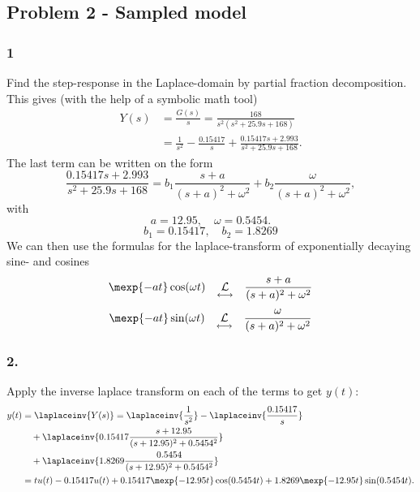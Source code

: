 \documentclass{scrartcl}
\begin{document}
\subsection*{Problem 2 - Sampled model}
\label{sec-8-2}
\subsubsection*{1}
\label{sec-8-2-1}

  Find the step-response in the Laplace-domain by partial fraction decomposition. This gives (with the help of a symbolic math tool)
       \begin{equation*}
        \begin{split}
         Y(s) &= \frac{G(s)}{s} = \frac{168}{s^2(s^2 + 25.9s + 168)}\\
              &= \frac{1}{s^2} - \frac{0.15417}{s} + \frac{0.15417s + 2.993}{s^2 + 25.9s + 168}.
        \end{split}
       \end{equation*}
      The last term can be written on the form 
      \[ \frac{0.15417s + 2.993}{s^2 + 25.9s + 168} = b_1\frac{s+a}{(s+a)^2 + \omega^2} + b_2\frac{\omega}{(s+a)^2 + \omega^2}, \] 
      with
      \[ a = 12.95, \quad \omega=0.5454. \]
      \[ b_1 = 0.15417, \quad b_2 = 1.8269\]
      We can then use the formulas for the laplace-transform of exponentially decaying sine- and cosines
      \[ \mexp{-at}\cos(\omega t) \quad \underset{\longleftrightarrow}{\mathcal{L}} \quad \frac{s+a}{(s+a)^2 + \omega^2} \]
      \[ \mexp{-at}\sin(\omega t) \quad \underset{\longleftrightarrow}{\mathcal{L}} \quad \frac{\omega}{(s+a)^2 + \omega^2} \]
\subsubsection*{2.}
\label{sec-8-2-2}

    Apply the inverse laplace transform on each of the terms to get $y(t)$:
       \begin{equation*}
        \begin{split}
         y(t) &= \laplaceinv{Y(s)} = \laplaceinv{\frac{1}{s^2}} - \laplaceinv{\frac{0.15417}{s}} \\
              & \quad + \laplaceinv{0.15417\frac{s+12.95}{(s+12.95)^2 + 0.5454^2}}\\
              & \quad + \laplaceinv{1.8269\frac{0.5454}{(s+12.95)^2 + 0.5454^2}}\\
              &= tu(t) - 0.15417u(t) + 0.15417\mexp{-12.95t}\cos(0.5454t) + 1.8269\mexp{-12.95t}\sin(0.5454t).
     \end{split}
    \end{equation*}
\end{document}
